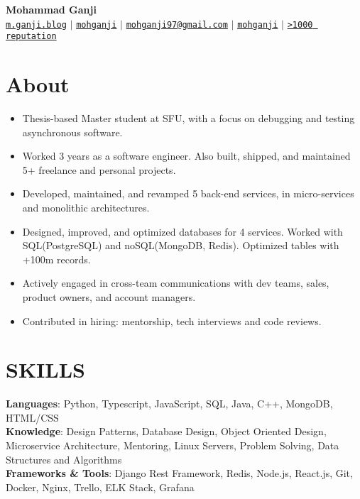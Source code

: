 \documentclass[letterpaper,10pt]{article}
\newcommand{\aboutItem}[1]{
  \item\small{
    {#1 \vspace{-6pt}}
  }
}
\newcommand{\resumeItemListStart}{\begin{itemize}}
\newcommand{\resumeItemListEnd}{\end{itemize}\vspace{-2pt}}
\newcommand{\github}[1]{{\faGithub \hspace{1pt} \href{https://github.com/#1/}{\texttt{#1}}}}
\newcommand{\email}[1]{\faEnvelope \hspace{1pt} \href{mailto:#1}{\texttt{#1}}}
\newcommand{\website}[1]{\faLink \hspace{1pt} \href{http://#1/}{\texttt{#1}}}
\newcommand{\stackoverflow}[2]{\faStackOverflow \hspace{1pt} \href{https://stackoverflow.com/users/#1}{\texttt{#2}}}
\newcommand{\linkedin}[1]{{\faLinkedin \hspace{1pt} \href{https://www.linkedin.com/in/#1/}{\texttt{#1}}}}
\begin{document}
\begin{center}
    \textbf{\Huge Mohammad Ganji} \\ \vspace{5pt}
    \small 
        \website{m.ganji.blog}
    \hspace{1pt} $|$ \hspace{1pt}
        \github{mohganji}
    \hspace{1pt} $|$ \hspace{1pt} 
        \email{mohganji97@gmail.com}
    \hspace{1pt} $|$ \hspace{1pt} 
        \linkedin{mohganji}
    \hspace{1pt} $|$ \hspace{1pt} 
        \stackoverflow{7025986/mo-ganji}{>1000 reputation}
    \\ \vspace{-3pt}
\end{center}

\section{About}

\resumeItemListStart
    \aboutItem{Thesis-based Master student at SFU, with a focus on debugging and testing asynchronous software. }
    \aboutItem{Worked 3 years as a software engineer. Also built, shipped, and maintained 5+ freelance and personal projects.}
    \aboutItem{Developed, maintained, and revamped 5 back-end services, in micro-services and monolithic architectures.}
    \aboutItem{Designed, improved, and optimized databases for 4 services. Worked with SQL(PostgreSQL) and noSQL(MongoDB, Redis). Optimized tables with +100m records.}
    \aboutItem{Actively engaged in cross-team communications with dev teams, sales, product owners, and account managers.}
    \aboutItem{Contributed in hiring: mentorship, tech interviews and code reviews.}
\resumeItemListEnd
        

\section{SKILLS}
 \begin{itemize}[leftmargin=0in, label={}]
    \small{\item{
       \textbf{Languages}{: Python, Typescript, JavaScript, SQL, Java, C++, MongoDB, HTML/CSS} \vspace{2pt} \\
       \textbf{Knowledge}{: Design Patterns, Database Design, Object Oriented Design, Microservice Architecture, Mentoring, Linux Servers, Problem Solving, Data Structures and Algorithms } \vspace{2pt} \\
       \textbf{Frameworks \& Tools}{: Django Rest Framework, Redis, Node.js, React.js, Git, Docker, Nginx, Trello, ELK Stack, Grafana}
    }}
 \end{itemize}
\end{document}
